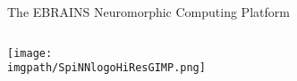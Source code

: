 \begin{myblock1}{\Large The EBRAINS Neuromorphic Computing Platform \phantom{\Huge $\beta$}}
\begin{columns}[t]
        \begin{column}{0.46\textwidth}
            \hspace{80mm} \texttt{[image: \\imgpath/SpiNNlogoHiResGIMP.png]}
        \end{column}
    \end{columns}
\end{myblock1}